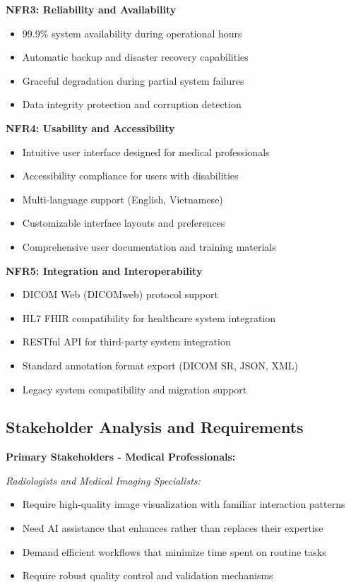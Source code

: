 \textbf{NFR3: Reliability and Availability}
\begin{itemize}
    \item 99.9\% system availability during operational hours
    \item Automatic backup and disaster recovery capabilities
    \item Graceful degradation during partial system failures
    \item Data integrity protection and corruption detection
\end{itemize}

\textbf{NFR4: Usability and Accessibility}
\begin{itemize}
    \item Intuitive user interface designed for medical professionals
    \item Accessibility compliance for users with disabilities
    \item Multi-language support (English, Vietnamese)
    \item Customizable interface layouts and preferences
    \item Comprehensive user documentation and training materials
\end{itemize}

\textbf{NFR5: Integration and Interoperability}
\begin{itemize}
    \item DICOM Web (DICOMweb) protocol support
    \item HL7 FHIR compatibility for healthcare system integration
    \item RESTful API for third-party system integration
    \item Standard annotation format export (DICOM SR, JSON, XML)
    \item Legacy system compatibility and migration support
\end{itemize}

\subsection{Stakeholder Analysis and Requirements}

\textbf{Primary Stakeholders - Medical Professionals:}

\textit{Radiologists and Medical Imaging Specialists:}
\begin{itemize}
    \item Require high-quality image visualization with familiar interaction patterns
    \item Need AI assistance that enhances rather than replaces their expertise
    \item Demand efficient workflows that minimize time spent on routine tasks
    \item Require robust quality control and validation mechanisms
\end{itemize}

